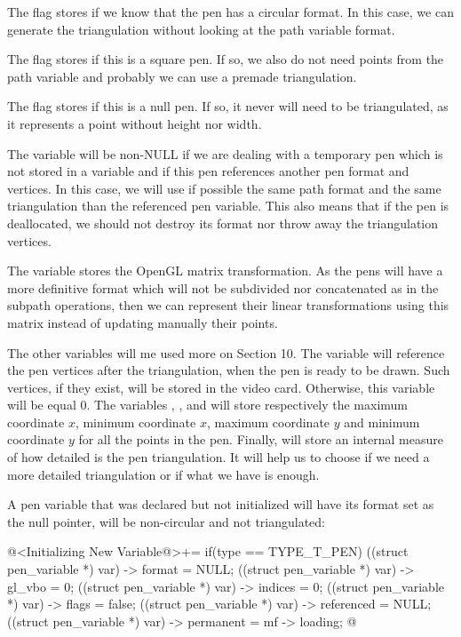 The flag  stores if we know that the pen has
a circular format. In this case, we can generate the triangulation
without looking at the path variable format.

The flag  stores if this is a square pen. If
so, we also do not need points from the path variable and probably we
can use a premade triangulation.

The flag  stores if this is a null pen. If so,
it never will need to be triangulated, as it represents a point
without height nor width.

The variable  will be non-NULL if we are
dealing with a temporary pen which is not stored in a variable and if
this pen references another pen format and vertices. In this case, we
will use if possible the same path format and the same triangulation
than the referenced pen variable. This also means that if the pen is
deallocated, we should not destroy its format nor throw away the
triangulation vertices.

The variable  stores the OpenGL matrix
transformation. As the pens will have a more definitive format which
will not be subdivided nor concatenated as in the subpath operations,
then we can represent their linear transformations using this matrix
instead of updating manually their points.

The other variables will me used more on Section 10. The
variable  will reference the pen vertices after
the triangulation, when the pen is ready to be drawn. Such vertices,
if they exist, will be stored in the video card. Otherwise, this
variable will be equal 0. The
variables , , 
and
 will store respectively the maximum coordinate $x$,
minimum coordinate $x$, maximum coordinate $y$ and minimum coordinate
$y$ for all the points in the
pen. Finally,  will store an internal
measure of how detailed is the pen triangulation. It will help us to
choose if we need a more detailed triangulation or if what we have is
enough.

A pen variable that was declared but not initialized will have its
format set as the null pointer, will be non-circular and not
triangulated:

\iniciocodigo
@<Initializing New Variable@>+=
if(type == TYPE_T_PEN){
  ((struct pen_variable *) var) -> format = NULL;
  ((struct pen_variable *) var) -> gl_vbo = 0;
  ((struct pen_variable *) var) -> indices = 0;
  ((struct pen_variable *) var) -> flags = false;
  ((struct pen_variable *) var) -> referenced = NULL;
  ((struct pen_variable *) var) -> permanent = mf -> loading;
}
@
\fimcodigo


